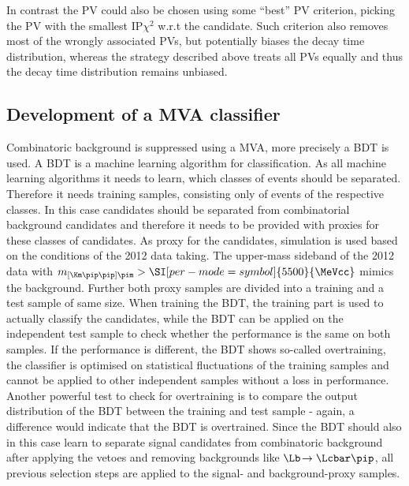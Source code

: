 In contrast the \ac{PV} could also be chosen using some \enquote{best} \ac{PV} criterion, \eg picking the \ac{PV} with the smallest $\text{IP}\chi^2$ w.r.t the \Bz candidate.
Such criterion also removes most of the wrongly associated \ac{PV}s, but potentially biases the decay time distribution, whereas the strategy described above treats all \ac{PV}s equally and thus the decay time distribution remains unbiased.

\subsection{Development of a MVA classifier}
\label{sec:MVADev}

Combinatoric background is suppressed using a \ac{MVA}, more precisely a \ac{BDT} is used.
A \ac{BDT} is a machine learning algorithm for classification.
As all machine learning algorithms it needs to learn, which classes of events should be separated.
Therefore it needs training samples, consisting only of events of the respective classes.
In this case \BdToDpi candidates should be separated from combinatorial background candidates and therefore it needs to be provided with proxies for these classes of candidates.
As proxy for the \BdToDpi candidates, simulation is used based on the conditions of the \num{2012} data taking.
The upper-mass sideband of the \num{2012} data with $m_{\left[\Km\pip\pip\right]\pim}>\SI[per-mode=symbol]{5500}{\MeVcc}$ mimics the background.
Further both proxy samples are divided into a training and a test sample of same size.
When training the \ac{BDT}, the training part is used to actually classify the candidates, while the \ac{BDT} can be applied on the independent test sample to check whether the performance is the same on both samples.
If the performance is different, the \ac{BDT} shows so-called overtraining, \ie the classifier is optimised on statistical fluctuations of the training samples and cannot be applied to other independent samples without a loss in performance.
Another powerful test to check for overtraining is to compare the output distribution of the \ac{BDT} between the training and test sample - again, a difference would indicate that the \ac{BDT} is overtrained.
Since the \ac{BDT} should also in this case learn to separate signal candidates from combinatoric background after applying the vetoes and removing backgrounds like $\Lb\!\to\Lcbar\pip$, all previous selection steps are applied to the signal- and background-proxy samples.

